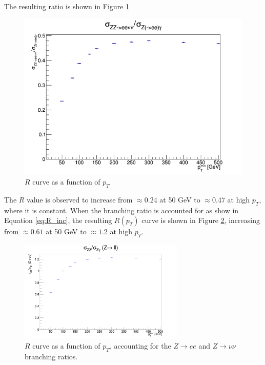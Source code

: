 \documentclass[11pt,a4paper,final]{report}
\begin{document}
The resulting ratio is shown in Figure \ref{fig:Rcurve}
\begin{figure}[H]
	\centering
	\includegraphics[scale=0.7]{Ratio_default.png}
	\caption{$R$ curve as a function of $p_T$}
	\label{fig:Rcurve}
\end{figure}
The $R$ value is observed to increase from $\approx 0.24$ at 50 GeV to $\approx 0.47$ at high $p_T$, where it is constant. When the branching ratio is accounted for as show in Equation \ref{eq:R_inc}, the resulting $R(p_T)$ curve is shown in Figure \ref{fig:RcurveBR}, increasing from $\approx 0.61$ at 50 GeV to $\approx 1.2$ at high $p_T$.
\begin{figure}[H]
	\centering
	\includegraphics[width = 0.7\textwidth]{Ratio_with_BR.png}
	\caption{$R$ curve as a function of $p_T$, accounting for the $Z\rightarrow ee$ and $Z\rightarrow \nu\nu$ branching ratios.}
	\label{fig:RcurveBR}
\end{figure}
\end{document}
